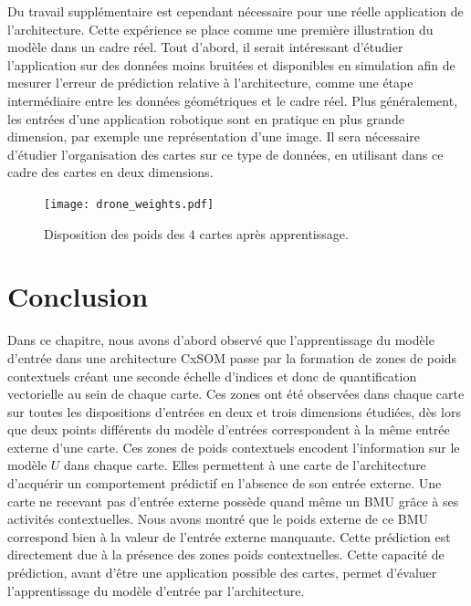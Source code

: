 \documentclass[../main]{subfiles}
\begin{document}
Du travail supplémentaire est cependant nécessaire pour une réelle application de l'architecture. Cette expérience se place comme une première illustration du modèle dans un cadre réel.
Tout d'abord, il serait intéressant d'étudier l'application sur des données moins bruitées et disponibles en simulation afin de mesurer l'erreur de prédiction relative à l'architecture, comme une étape intermédiaire entre les données géométriques et le cadre réel. 
Plus généralement, les entrées d'une application robotique sont en pratique en plus grande dimension, par exemple une représentation d'une image.
Il sera nécessaire d'étudier l'organisation des cartes sur ce type de données, en utilisant dans ce cadre des cartes en deux dimensions.

\begin{figure}
\texttt{[image: drone\_weights.pdf]}
\caption{Disposition des poids des 4 cartes après apprentissage.}
\label{fig:drone_w}
\end{figure}

\section{Conclusion}

Dans ce chapitre, nous avons d'abord observé que l'apprentissage du modèle d'entrée dans une architecture CxSOM passe par la formation de zones de poids contextuels créant une seconde échelle d'indices et donc de quantification vectorielle au sein de chaque carte. Ces zones ont été observées dans chaque carte sur toutes les dispositions d'entrées en deux et trois dimensions étudiées, dès lors que deux points différents du modèle d'entrées correspondent à la même entrée externe d'une carte.
Ces zones de poids contextuels encodent l'information sur le modèle $U$ dans chaque carte. Elles permettent à une carte de l'architecture d'acquérir un comportement prédictif en l'absence de son entrée externe. Une carte ne recevant pas d'entrée externe possède quand même un BMU grâce à ses activités contextuelles. Nous avons montré que le poids externe de ce BMU correspond bien à la valeur de l'entrée externe manquante. Cette prédiction est directement due à la présence des zones poids contextuelles.
Cette capacité de prédiction, avant d'être une application possible des cartes, permet d'évaluer l'apprentissage du modèle d'entrée par l'architecture.
\end{document}
